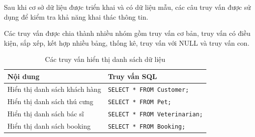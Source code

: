 Sau khi cơ sở dữ liệu được triển khai và có dữ liệu mẫu, các câu truy vấn được sử dụng để kiểm tra khả năng khai thác thông tin.

Các truy vấn được chia thành nhiều nhóm gồm truy vấn cơ bản, truy vấn có điều kiện, sắp xếp, kết hợp nhiều bảng, thống kê, truy vấn với NULL và truy vấn con.

\begin{table}[htbp]
    \centering
    \caption{Các truy vấn hiển thị danh sách dữ liệu}
    \label{tab:display_queries}
    \begin{tabularx}{\textwidth}{|X|X|}
        \hline
        \textbf{Nội dung} & \textbf{Truy vấn SQL} \\ \hline

        Hiển thị danh sách khách hàng &
        \texttt{SELECT * FROM Customer;}
        \\ \hline

        Hiển thị danh sách thú cưng &
        \texttt{SELECT * FROM Pet;}
        \\ \hline

        Hiển thị danh sách bác sĩ &
        \texttt{SELECT * FROM Veterinarian;}
        \\ \hline

        Hiển thị danh sách booking &
        \texttt{SELECT * FROM Booking;}
        \\ \hline

    \end{tabularx}
\end{table}

